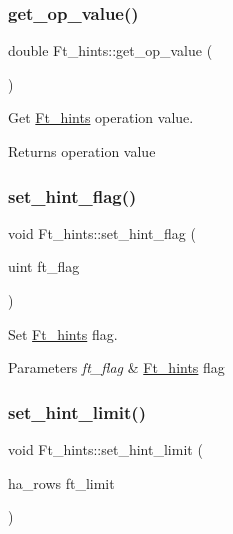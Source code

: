 \subsubsection{\texorpdfstring{get\+\_\+op\+\_\+value()}{get\_op\_value()}}
{\footnotesize\ttfamily double Ft\+\_\+hints\+::get\+\_\+op\+\_\+value (\begin{DoxyParamCaption}{ }\end{DoxyParamCaption})\hspace{0.3cm}{\ttfamily [inline]}}

Get \mbox{\hyperlink{classFt__hints}{Ft\+\_\+hints}} operation value.

\begin{DoxyReturn}{Returns}
operation value 
\end{DoxyReturn}
\mbox{\label{classFt__hints_a12304b6a95cbd167360f07068fd5a81d}} 
\subsubsection{\texorpdfstring{set\+\_\+hint\+\_\+flag()}{set\_hint\_flag()}}
{\footnotesize\ttfamily void Ft\+\_\+hints\+::set\+\_\+hint\+\_\+flag (\begin{DoxyParamCaption}\item[{uint}]{ft\+\_\+flag }\end{DoxyParamCaption})\hspace{0.3cm}{\ttfamily [inline]}}

Set \mbox{\hyperlink{classFt__hints}{Ft\+\_\+hints}} flag.


\begin{DoxyParams}{Parameters}
{\em ft\+\_\+flag} & \mbox{\hyperlink{classFt__hints}{Ft\+\_\+hints}} flag \\
\hline
\end{DoxyParams}
\mbox{\label{classFt__hints_aa86f02bd7c571cd622878774be4db5e2}} 
\subsubsection{\texorpdfstring{set\+\_\+hint\+\_\+limit()}{set\_hint\_limit()}}
{\footnotesize\ttfamily void Ft\+\_\+hints\+::set\+\_\+hint\+\_\+limit (\begin{DoxyParamCaption}\item[{ha\+\_\+rows}]{ft\+\_\+limit }\end{DoxyParamCaption})\hspace{0.3cm}{\ttfamily [inline]}}

